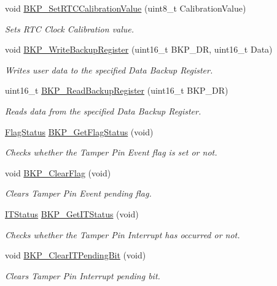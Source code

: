 \begin{DoxyCompactItemize}
void \hyperlink{group___b_k_p___private___functions_gad34db08a944450d2e7d56d0fd8db2bca}{B\+K\+P\+\_\+\+Set\+R\+T\+C\+Calibration\+Value} (uint8\+\_\+t Calibration\+Value)
\begin{DoxyCompactList}\small\item\em Sets R\+TC Clock Calibration value. \end{DoxyCompactList}\item 
void \hyperlink{group___b_k_p___private___functions_ga18d220387db651b3cb71fad5c092e041}{B\+K\+P\+\_\+\+Write\+Backup\+Register} (uint16\+\_\+t B\+K\+P\+\_\+\+DR, uint16\+\_\+t Data)
\begin{DoxyCompactList}\small\item\em Writes user data to the specified Data Backup Register. \end{DoxyCompactList}\item 
uint16\+\_\+t \hyperlink{group___b_k_p___private___functions_ga359d8fbc945e0f4e34fedbe037d842c8}{B\+K\+P\+\_\+\+Read\+Backup\+Register} (uint16\+\_\+t B\+K\+P\+\_\+\+DR)
\begin{DoxyCompactList}\small\item\em Reads data from the specified Data Backup Register. \end{DoxyCompactList}\item 
\hyperlink{group___exported__types_ga89136caac2e14c55151f527ac02daaff}{Flag\+Status} \hyperlink{group___b_k_p___private___functions_gacc9aedde760383f0bd146f0d77a547db}{B\+K\+P\+\_\+\+Get\+Flag\+Status} (void)
\begin{DoxyCompactList}\small\item\em Checks whether the Tamper Pin Event flag is set or not. \end{DoxyCompactList}\item 
void \hyperlink{group___b_k_p___private___functions_ga3f3aea5b0a3d8d5d79b0b506928351ea}{B\+K\+P\+\_\+\+Clear\+Flag} (void)
\begin{DoxyCompactList}\small\item\em Clears Tamper Pin Event pending flag. \end{DoxyCompactList}\item 
\hyperlink{group___exported__types_gaacbd7ed539db0aacd973a0f6eca34074}{I\+T\+Status} \hyperlink{group___b_k_p___private___functions_ga99566c9f1f17f499020606cb63511494}{B\+K\+P\+\_\+\+Get\+I\+T\+Status} (void)
\begin{DoxyCompactList}\small\item\em Checks whether the Tamper Pin Interrupt has occurred or not. \end{DoxyCompactList}\item 
void \hyperlink{group___b_k_p___private___functions_ga6a93ef8e40959bb10fea670e2040ad74}{B\+K\+P\+\_\+\+Clear\+I\+T\+Pending\+Bit} (void)
\begin{DoxyCompactList}\small\item\em Clears Tamper Pin Interrupt pending bit. \end{DoxyCompactList}\end{DoxyCompactItemize}


